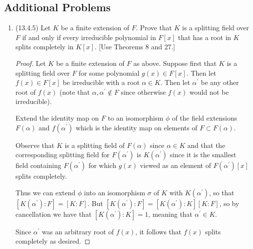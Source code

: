 \documentclass[11pt]{article}
\begin{document}
\subsection*{Additional Problems}
\begin{enumerate}
    \item (13.4.5) Let $K$ be a finite extension of $F$. Prove that $K$ is a splitting field over $F$ if and only if every irreducible polynomial in $F[x]$ that has a root in $K$ splits completely in $K[x]$. [Use Theorems 8 and 27.] \begin{proof}
        Let $K$ be a finite extension of $F$ as above. Suppose first that $K$ is a splitting field over $F$ for some polynomial $g(x)\in F[x]$. Then let $f(x)\in F[x]$ be irreducible with a root $\alpha\in K$. Then let $\alpha^\prime$ be any other root of $f(x)$ (note that $\alpha, \alpha^\prime\not\in F$ since otherwise $f(x)$ would not be irreducible).

        Extend the identity map on $F$ to an isomorphism $\phi$ of the field extensions $F(\alpha)$ and $f(\alpha^\prime)$ which is the identity map on elements of $F\subset F(\alpha)$.
        
        Observe that $K$ is a splitting field of $F(\alpha)$ since $\alpha\in K$ and that the corresponding splitting field for $F(\alpha^\prime)$ is $K(\alpha^\prime)$ since it is the smallest field containing $F(\alpha^\prime)$ for which $g(x)$ viewed as an element of $F(\alpha^\prime)[x]$ splits completely.

        Thus we can extend $\phi$ into an isomorphism $\sigma$ of $K$ with $K(\alpha^\prime)$, so that $[K(\alpha^\prime)\colon F] = [K\colon F]$. But $[K(\alpha^\prime)\colon F] = [K(\alpha^\prime)\colon K][K\colon F]$, so by cancellation we have that $[K(\alpha^\prime)\colon K] = 1$, meaning that $\alpha^\prime\in K$.
        
        Since $\alpha^\prime$ was an arbitrary root of $f(x)$, it follows that $f(x)$ splits completely as desired. 


\end{proof}
\end{enumerate}
\end{document}
